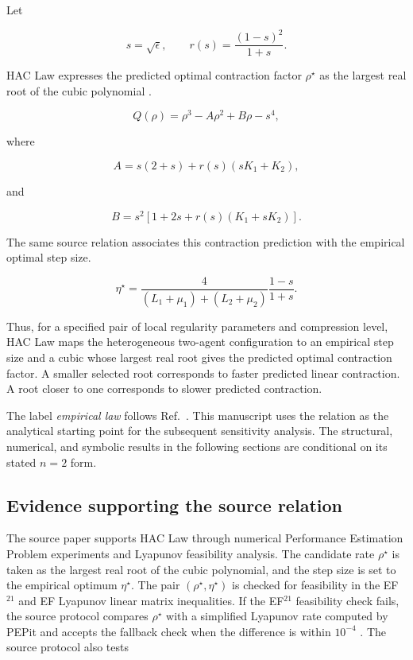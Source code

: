 Let

\[
s=\sqrt{\epsilon},
\qquad
r(s)=\frac{(1-s)^2}{1+s}.
\]

HAC Law expresses the predicted optimal contraction factor $\rho^\star$ as the largest real root of the cubic polynomial \citep{thomsen2026tight}.

\[
Q(\rho)=\rho^3-A\rho^2+B\rho-s^4,
\]

where

\[
A=s(2+s)+r(s)(sK_1+K_2),
\]

and

\[
B=s^2\left[1+2s+r(s)(K_1+sK_2)\right].
\]

The same source relation associates this contraction prediction with the empirical optimal step size.

\[
\eta^\star=
\frac{4}{(L_1+\mu_1)+(L_2+\mu_2)}
\frac{1-s}{1+s}.
\]

Thus, for a specified pair of local regularity parameters and compression level, HAC Law maps the heterogeneous two-agent configuration to an empirical step size and a cubic whose largest real root gives the predicted optimal contraction factor. A smaller selected root corresponds to faster predicted linear contraction. A root closer to one corresponds to slower predicted contraction.

The label \emph{empirical law} follows Ref.~\cite{thomsen2026tight}. This manuscript uses the relation as the analytical starting point for the subsequent sensitivity analysis. The structural, numerical, and symbolic results in the following sections are conditional on its stated $n=2$ form.

\subsection{Evidence supporting the source relation}

The source paper supports HAC Law through numerical Performance
Estimation Problem experiments and Lyapunov feasibility analysis. The candidate
rate $\rho^\star$ is taken as the largest real root of the cubic polynomial,
and the step size is set to the empirical optimum $\eta^\star$. The pair
$(\rho^\star,\eta^\star)$ is checked for feasibility in the EF$^{21}$ and
EF Lyapunov linear matrix inequalities. If the EF$^{21}$ feasibility check
fails, the source protocol compares $\rho^\star$ with a simplified Lyapunov
rate computed by PEPit and accepts the fallback check when the difference is
within $10^{-4}$ \citep{thomsen2026tight,goujaud2024pepit}. The source
protocol also tests

